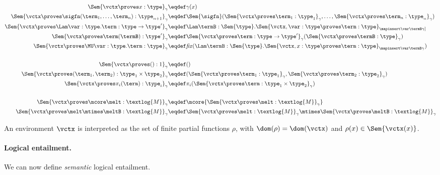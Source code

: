 \begin{align*}
	\Sem{\vctx \proves x : \type}_\gamma &\eqdef \gamma(x) \\
	\Sem{\vctx \proves \sigfn(\term_1, \dots, \term_n) : \type_{n+1}}_\gamma &\eqdef \Sem{\sigfn}(\Sem{\vctx \proves \term_1 : \type_1}_\gamma, \dots, \Sem{\vctx \proves \term_n : \type_n}_\gamma) \\
	\Sem{\vctx \proves \Lam \var:\type. \term : \type \to \type'}_\gamma &\eqdef
	\Lam \termB : \Sem{\type}. \Sem{\vctx, \var : \type \proves \term : \type}_{\mapinsert \var \termB \gamma]} \\
	\Sem{\vctx \proves \term(\termB) : \type'}_\gamma &\eqdef
	\Sem{\vctx \proves \term : \type \to \type'}_\gamma(\Sem{\vctx \proves \termB : \type}_\gamma) \\
	\Sem{\vctx \proves \MU \var:\type. \term : \type}_\gamma &\eqdef
	\mathit{fix}(\Lam \termB : \Sem{\type}. \Sem{\vctx, x : \type \proves \term : \type}_{\mapinsert \var \termB \gamma}) \\
  ~\\
	\Sem{\vctx \proves () : 1}_\gamma &\eqdef () \\
	\Sem{\vctx \proves (\term_1, \term_2) : \type_1 \times \type_2}_\gamma &\eqdef (\Sem{\vctx \proves \term_1 : \type_1}_\gamma, \Sem{\vctx \proves \term_2 : \type_2}_\gamma) \\
	\Sem{\vctx \proves \pi_i(\term) : \type_i}_\gamma &\eqdef \pi_i(\Sem{\vctx \proves \term : \type_1 \times \type_2}_\gamma) \\
  ~\\
	\Sem{\vctx \proves \mcore\melt : \textlog{M}}_\gamma &\eqdef \mcore{\Sem{\vctx \proves \melt : \textlog{M}}_\gamma} \\
	\Sem{\vctx \proves \melt \mtimes \meltB : \textlog{M}}_\gamma &\eqdef
	\Sem{\vctx \proves \melt : \textlog{M}}_\gamma \mtimes \Sem{\vctx \proves \meltB : \textlog{M}}_\gamma
\end{align*}
%

An environment $\vctx$ is interpreted as the set of
finite partial functions $\rho$, with $\dom(\rho) = \dom(\vctx)$ and
$\rho(x)\in\Sem{\vctx(x)}$.

\paragraph{Logical entailment.}
We can now define \emph{semantic} logical entailment.

